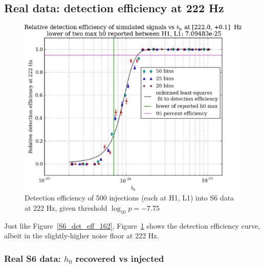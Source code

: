 


\subsection{Real data: detection efficiency at 222 Hz}

\begin{figure}
\begin{center}
\includegraphics[width=0.5\paperwidth,height=0.35\paperheight]{plots/detectionEfficiencyh0-222-0Hz.eps}
\caption{
Detection efficiency of 500 injections (each at H1, L1) into
S6 data at 222 Hz, given threshold $\log_{10}p = -7.75$}
\label{S6_det_eff_222}
\end{center}
\end{figure}

Just like Figure~\ref{S6_det_eff_162}, Figure~\ref{S6_det_eff_222} shows the detection efficiency curve, albeit in the slightly-higher noise floor at 222 Hz.

\subsubsection{Real S6 data: $h_0$ recovered vs injected}

